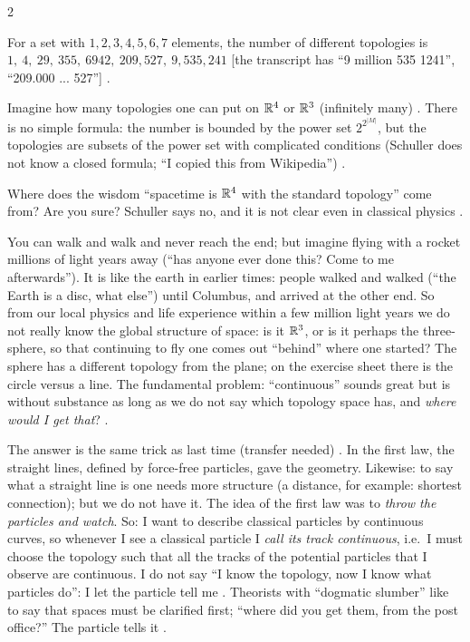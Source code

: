 \begin{paracol}{2}
\begin{definition}\label{def:tm-count}
For a set with $1,2,3,4,5,6,7$ elements, the number of different topologies is
$1,\ 4,\ 29,\ 355,\ 6942,\ 209{,}527,\ 9{,}535{,}241$ [the transcript has ``9 million 535 1241'', ``209.000 ... 527'']
.
\end{definition}
Imagine how many topologies one can put on $\mathbb{R}^4$ or $\mathbb{R}^3$ (infinitely many) . There is no simple formula:
the number is bounded by the power set $2^{2^{|M|}}$, but the topologies are subsets of the power set with complicated
conditions (Schuller does not know a closed formula; ``I copied this from Wikipedia'') .

Where does the wisdom ``spacetime is $\mathbb{R}^4$ with the standard topology'' come from? Are you sure? Schuller says no, and it
is not clear even in classical physics .

\begin{intuition}
You can walk and walk and never reach the end; but imagine flying with a rocket millions of light years away (``has
anyone ever done this? Come to me afterwards''). It is like the earth in earlier times: people walked and walked
(``the Earth is a disc, what else'') until Columbus, and arrived at the other end. So from our local physics and life
experience within a few million light years we do not really know the global structure of space: is it $\mathbb{R}^3$, or is
it perhaps the three-sphere, so that continuing to fly one comes out ``behind'' where one started? The sphere has a
different topology from the plane; on the exercise sheet there is the circle versus a line. The fundamental problem:
``continuous'' sounds great but is without substance as long as we do not say which topology space has, and
\emph{where would I get that}? .
\end{intuition}

The answer is the same trick as last time (transfer needed) . In the first law, the
straight lines, defined by force-free particles, gave the geometry. Likewise: to say what a straight line is one needs
more structure (a distance, for example: shortest connection); but we do not have it. The idea of the first law was
to \emph{throw the particles and watch}. So: I want to describe classical particles by continuous curves, so whenever I see
a classical particle I \emph{call its track continuous}, i.e.\ I must choose the topology such that all the tracks of
the potential particles that I observe are continuous. I do not say ``I know the topology, now I know what particles
do'': I let the particle tell me .
Theorists with ``dogmatic slumber'' like to say that spaces must be clarified first; ``where did you get them, from the
post office?'' The particle tells it .


\end{paracol}
